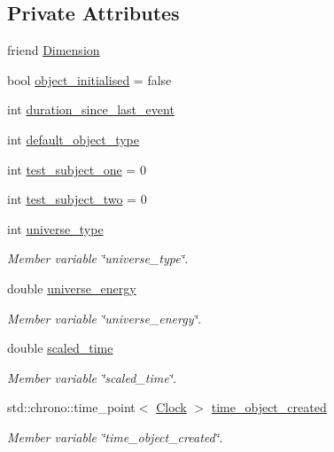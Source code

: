 \subsection*{Private Attributes}
\begin{DoxyCompactItemize}
\item 
friend \mbox{\hyperlink{classUniverse_aeccab978b0db45b64015aebdf44fa2d8}{Dimension}}
\item 
bool \mbox{\hyperlink{classUniverse_af8893059e57118d5da20d512b1df4d20}{object\+\_\+initialised}} = false
\item 
int \mbox{\hyperlink{classUniverse_a76279bc43f1ce7a7fc4ee2f6a2cf4228}{duration\+\_\+since\+\_\+last\+\_\+event}}
\item 
int \mbox{\hyperlink{classUniverse_a6c530f6d3647d078794b1060afbb1acf}{default\+\_\+object\+\_\+type}}
\item 
int \mbox{\hyperlink{classUniverse_ac7a26cb9cb97f61bb270a7bbef4a2ae2}{test\+\_\+subject\+\_\+one}} = 0
\item 
int \mbox{\hyperlink{classUniverse_ae4768ac314bcab322ffe484658b2bb06}{test\+\_\+subject\+\_\+two}} = 0
\item 
int \mbox{\hyperlink{classUniverse_a4332e3210a61dcfcb26e16b9f604d489}{universe\+\_\+type}}
\begin{DoxyCompactList}\small\item\em Member variable \char`\"{}universe\+\_\+type\char`\"{}. \end{DoxyCompactList}\item 
double \mbox{\hyperlink{classUniverse_a86742eff738f3d7812da8581a59f0812}{universe\+\_\+energy}}
\begin{DoxyCompactList}\small\item\em Member variable \char`\"{}universe\+\_\+energy\char`\"{}. \end{DoxyCompactList}\item 
double \mbox{\hyperlink{classUniverse_a0406fae45a576526b0ea78b2b5a74ebb}{scaled\+\_\+time}}
\begin{DoxyCompactList}\small\item\em Member variable \char`\"{}scaled\+\_\+time\char`\"{}. \end{DoxyCompactList}\item 
std\+::chrono\+::time\+\_\+point$<$ \mbox{\hyperlink{universe_8h_a0ef8d951d1ca5ab3cfaf7ab4c7a6fd80}{Clock}} $>$ \mbox{\hyperlink{classUniverse_a49ef0c3c2bd9ec438f5d9703c6aaa402}{time\+\_\+object\+\_\+created}}
\begin{DoxyCompactList}\small\item\em Member variable \char`\"{}time\+\_\+object\+\_\+created\char`\"{}. \end{DoxyCompactList}\item 

\end{DoxyCompactItemize}
